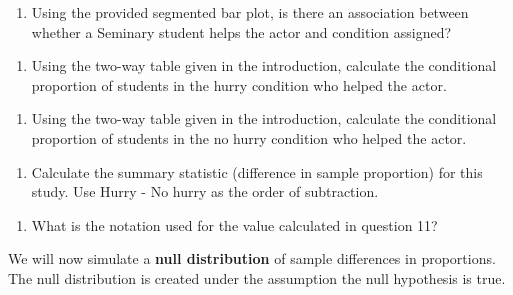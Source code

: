\documentclass[
]{report}
\providecommand{\tightlist}{%
  \setlength{\itemsep}{0pt}\setlength{\parskip}{0pt}}
\begin{document}
\begin{enumerate}
\def\labelenumi{\arabic{enumi}.}
\setcounter{enumi}{7}
\tightlist
\item
  Using the provided segmented bar plot, is there an association between whether a Seminary student helps the actor and condition assigned?
\end{enumerate}

\vspace{0.5in}

\begin{enumerate}
\def\labelenumi{\arabic{enumi}.}
\setcounter{enumi}{8}
\tightlist
\item
  Using the two-way table given in the introduction, calculate the conditional proportion of students in the hurry condition who helped the actor.
\end{enumerate}

\vspace{.3in}

\begin{enumerate}
\def\labelenumi{\arabic{enumi}.}
\setcounter{enumi}{9}
\tightlist
\item
  Using the two-way table given in the introduction, calculate the conditional proportion of students in the no hurry condition who helped the actor.
\end{enumerate}

\vspace{.3in}

\begin{enumerate}
\def\labelenumi{\arabic{enumi}.}
\setcounter{enumi}{10}
\tightlist
\item
  Calculate the summary statistic (difference in sample proportion) for this study. Use Hurry - No hurry as the order of subtraction.
\end{enumerate}

\vspace{0.4in}

\begin{enumerate}
\def\labelenumi{\arabic{enumi}.}
\setcounter{enumi}{11}
\tightlist
\item
  What is the notation used for the value calculated in question 11?
\end{enumerate}

\newpage

We will now simulate a \textbf{null distribution} of sample differences in proportions. The null distribution is created under the assumption the null hypothesis is true.
\end{document}
